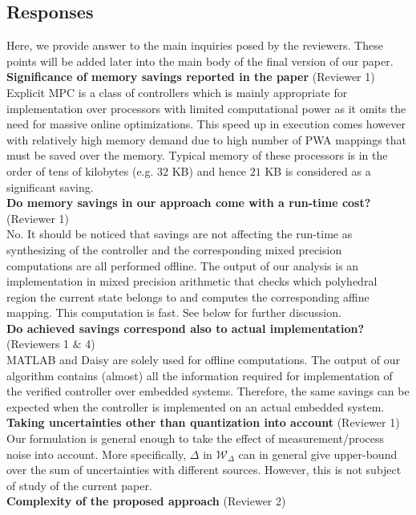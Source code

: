 {\subsection{Responses}
Here, we provide answer to the main inquiries posed by the reviewers. These points will be added later into the main body of the final version of our paper.\\
\textbf{Significance of memory savings reported in the paper} (Reviewer 1)\\
Explicit MPC is a class of controllers which is mainly appropriate for implementation over processors with limited computational power as it omits the need for massive online optimizations. This speed up in execution comes however with relatively high memory demand due to high number of PWA mappings that must be saved over the memory. Typical memory of these processors is in the order of tens of kilobytes (e.g. $32$ KB) and hence $21$ KB is considered as a significant saving.\\
\textbf{Do memory savings in our approach come with a run-time cost?} (Reviewer 1)\\
No. It should be noticed that savings are not affecting the run-time as synthesizing of the controller and the corresponding mixed precision computations are all performed offline. The output of our analysis is an implementation in mixed precision arithmetic that checks which polyhedral region the current state belongs to and computes the corresponding affine mapping. This computation is fast. See below for further discussion.\\
\textbf{Do achieved savings correspond also to actual implementation?} (Reviewers 1 $\&$ 4)\\
MATLAB and Daisy are solely used for offline computations. The output of our algorithm contains (almost) all the information required for implementation of the verified controller over embedded systems. Therefore, the same savings can be expected when the controller is implemented on an actual embedded system.\\
\textbf{Taking uncertainties other than quantization into account} (Reviewer 1)\\
Our formulation is general enough to take the effect of measurement/process noise into account. More specifically, $\Delta$ in $\mathcal{W}_{\Delta}$ can in general give upper-bound over the sum of uncertainties with different sources. However, this is not subject of study of the current paper.\\
\textbf{Complexity of the proposed approach} (Reviewer 2)\\
}
